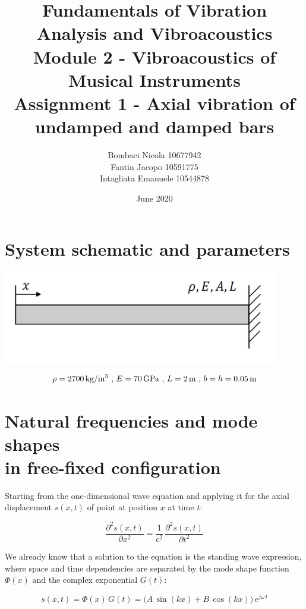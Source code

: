 \documentclass[a4paper,12pt,oneside]{article}
\title{Fundamentals of Vibration Analysis and Vibroacoustics \\
	Module 2 - Vibroacoustics of Musical Instruments \\
	Assignment 1 - Axial vibration of undamped and damped bars}
\author{Bombaci Nicola 10677942 \\
	Fantin Jacopo 10591775 \\
	Intagliata Emanuele 10544878}
\date{June 2020}
\begin{document}
\maketitle

\vspace{100pt}

\section*{System schematic and parameters}

\includegraphics[width=0.9\textwidth]{system_schematic}

\vspace{30pt}

\[
	\rho = 2700 \, \text{kg/m\textsuperscript{3}} ~ \text{,} ~ E = 70 \, \text{GPa} %
		~ \text{,} ~ L = 2 \, \text{m} ~ \text{,} ~ b = h = 0.05 \, \text{m}
\]

\clearpage


\section{Natural frequencies and mode shapes \\ in free-fixed configuration}
\label{sec:nat_freqs_and_mode_shapes_free_fixed}

Starting from the one-dimensional wave equation and applying it for the axial displacement $ s(x,t) $ of point at position $ x $ at time $ t $:

\[
	\frac{\partial^2 s(x,t)}{\partial x^2} = %
		\frac{1}{c^2} \, \frac{\partial^2 s(x,t)}{\partial t^2}
\]

We already know that a solution to the equation is the standing wave expression, where space and time dependencies are separated by the mode shape function $ \Phi(x) $ and the complex exponential $ G(t) $:

\[
	s(x,t) = \Phi(x) \, G(t) = %
		\bigl(A \, \sin(kx) + B \, \cos(kx)\bigl) \, e^{j \omega \, t}
\]

\vspace{10pt}
\end{document}
